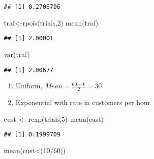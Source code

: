 \documentclass[
]{article}
\newenvironment{Shaded}{\begin{snugshade}}{\end{snugshade}}
\newcommand{\DecValTok}[1]{\textcolor[rgb]{0.00,0.00,0.81}{#1}}
\newcommand{\FunctionTok}[1]{\textcolor[rgb]{0.00,0.00,0.00}{#1}}
\newcommand{\NormalTok}[1]{#1}
\newcommand{\OtherTok}[1]{\textcolor[rgb]{0.56,0.35,0.01}{#1}}
\newcommand{\SpecialCharTok}[1]{\textcolor[rgb]{0.00,0.00,0.00}{#1}}
\providecommand{\tightlist}{%
  \setlength{\itemsep}{0pt}\setlength{\parskip}{0pt}}
\begin{document}
\begin{verbatim}
## [1] 0.2706706
\end{verbatim}

\begin{Shaded}
\begin{Highlighting}[]
\NormalTok{traf}\OtherTok{\textless{}{-}}\FunctionTok{rpois}\NormalTok{(trials,}\DecValTok{2}\NormalTok{)}
\FunctionTok{mean}\NormalTok{(traf)}
\end{Highlighting}
\end{Shaded}

\begin{verbatim}
## [1] 2.00001
\end{verbatim}

\begin{Shaded}
\begin{Highlighting}[]
\FunctionTok{var}\NormalTok{(traf)}
\end{Highlighting}
\end{Shaded}

\begin{verbatim}
## [1] 2.00677
\end{verbatim}

\begin{enumerate}
\def\labelenumi{\alph{enumi}.}
\setcounter{enumi}{2}
\tightlist
\item
  Uniform, \(Mean = \frac{60-0}{2} = 30\)
\item
  Exponential with rate in customers per hour
\end{enumerate}

\begin{Shaded}
\begin{Highlighting}[]
\NormalTok{cust }\OtherTok{\textless{}{-}} \FunctionTok{rexp}\NormalTok{(trials,}\DecValTok{5}\NormalTok{)}
\FunctionTok{mean}\NormalTok{(cust)}
\end{Highlighting}
\end{Shaded}

\begin{verbatim}
## [1] 0.1999709
\end{verbatim}

\begin{Shaded}
\begin{Highlighting}[]
\FunctionTok{mean}\NormalTok{(cust}\SpecialCharTok{\textless{}}\NormalTok{(}\DecValTok{10}\SpecialCharTok{/}\DecValTok{60}\NormalTok{))}
\end{Highlighting}
\end{Shaded}
\end{document}
